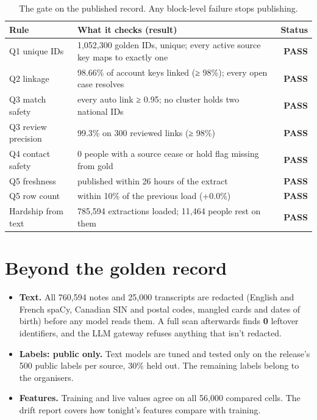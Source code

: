 \documentclass[11pt]{article}
\begin{document}
\begin{table}[htbp]\small\centering
\begin{tabularx}{\linewidth}{@{}lL r@{}}
\toprule
\textbf{Rule} & \textbf{What it checks (result)} & \textbf{Status} \\
\midrule
Q1 unique IDs & 1,052,300 golden IDs, unique; every active source key maps to exactly one & \textbf{\color{kgreen}PASS} \\
Q2 linkage & 98.66\% of account keys linked (≥ 98\%); every open case resolves & \textbf{\color{kgreen}PASS} \\
Q3 match safety & every auto link ≥ 0.95; no cluster holds two national IDs & \textbf{\color{kgreen}PASS} \\
Q3 review precision & 99.3\% on 300 reviewed links (≥ 98\%) & \textbf{\color{kgreen}PASS} \\
Q4 contact safety & 0 people with a source cease or hold flag missing from gold & \textbf{\color{kgreen}PASS} \\
Q5 freshness & published within 26 hours of the extract & \textbf{\color{kgreen}PASS} \\
Q5 row count & within 10\% of the previous load (+0.0\%) & \textbf{\color{kgreen}PASS} \\
Hardship from text & 785,594 extractions loaded; 11,464 people rest on them & \textbf{\color{kgreen}PASS} \\
\bottomrule
\end{tabularx}
\caption{The gate on the published record. Any block-level failure stops publishing.}
\end{table}

\section{Beyond the golden record}

\begin{itemize}
\item \textbf{Text.} All 760,594 notes and 25,000 transcripts are redacted (English and French spaCy, Canadian SIN and
postal codes, mangled cards and dates of birth) before any model reads them. A full scan afterwards finds \textbf{0}
leftover identifiers, and the LLM gateway refuses anything that isn't redacted.
\item \textbf{Labels: public only.} Text models are tuned and tested only on the release's 500 public labels per source,
30\% held out. The remaining labels belong to the organisers.
\item \textbf{Features.} Training and live values agree on all 56,000 compared cells. The drift report covers how
tonight's features compare with training.
\end{itemize}
\end{document}
